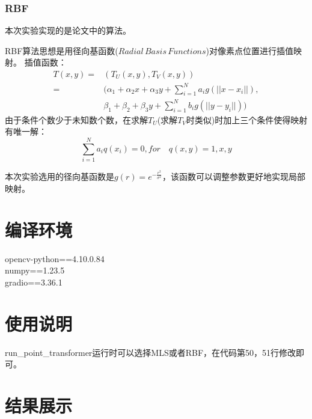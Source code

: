 \documentclass{article}
\begin{document}
	\subsubsection{RBF}
	本次实验实现的是论文\cite{RBF}中的算法。
	
	RBF算法思想是用径向基函数($Radial\,Basis\,Functions$)对像素点位置进行插值映射。
	插值函数：
	\begin{equation}
		\begin{aligned}
			T(x,y)=&(T_U(x,y),T_V(x,y))\\
			=&(\alpha_1+\alpha_2x+\alpha_3y+\sum_{i=1}^{N}a_ig(||x-x_i||),\\
			&\beta_1+\beta_2+\beta_3y+\sum_{i=1}^{N}b_ig(||y-y_i||))
		\end{aligned}
	\end{equation}
	由于条件个数少于未知数个数，在求解$T_U$(求解$T_V$时类似)时加上三个条件使得映射有唯一解：
	$$\sum_{i=1}^{N}a_iq(x_i)=0,for\quad q(x,y)=1,x,y$$
	
	本次实验选用的径向基函数是$g(r)=e^{-\frac{r^2}{\sigma^2}}$，该函数可以调整参数更好地实现局部映射。
	
	\section{编译环境}\noindent
	opencv-python==4.10.0.84\\
	numpy==1.23.5\\
	gradio==3.36.1
	\section{使用说明}
	run\_point\_transformer运行时可以选择MLS或者RBF，在代码第50，51行修改即可。
	\section{结果展示}
\end{document}

